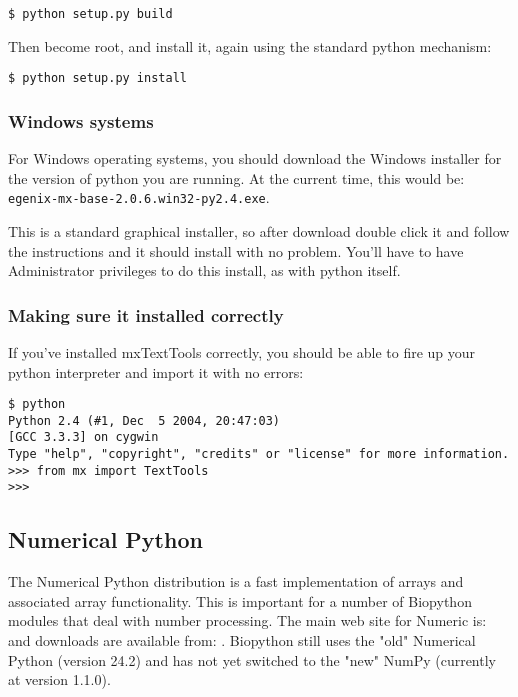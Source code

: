 \documentclass{article}
\begin{document}
\begin{verbatim}
$ python setup.py build
\end{verbatim}

Then become root, and install it, again using the standard python
mechanism:

\begin{verbatim}
$ python setup.py install
\end{verbatim}

\subsubsection{Windows systems}

For Windows operating systems, you should download the Windows installer
for the version of python you are running. At the current time, this
would be: \verb|egenix-mx-base-2.0.6.win32-py2.4.exe|.


This is a standard graphical installer, so after download double click
it and follow the instructions and it should install with no problem.
You'll have to have Administrator privileges to do this install, as with
python itself.

\subsubsection{Making sure it installed correctly}

If you've installed mxTextTools correctly, you should be able to fire up
your python interpreter and import it with no errors:

\begin{verbatim}
$ python
Python 2.4 (#1, Dec  5 2004, 20:47:03)
[GCC 3.3.3] on cygwin
Type "help", "copyright", "credits" or "license" for more information.
>>> from mx import TextTools
>>>
\end{verbatim}

\subsection{Numerical Python}

The Numerical Python distribution is a fast implementation of arrays and
associated array functionality. This is important for a number of Biopython
modules that deal with number processing. The main web site for Numeric is:
 and downloads are
available from:
.
Biopython still uses the "old" Numerical Python (version 24.2) and has not yet switched to the "new" NumPy (currently at version 1.1.0).
\end{document}
